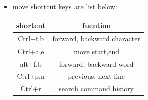 \documentclass[a4paper,12pt,twoside]{book}
\begin{document}
 \begin{itemize}
  \item move shortcut keys are list below:
\begin{center}
  \begin{tabular}{|c|c|}
 \hline shortcut & fucntion \\
\hline Ctrl+f,b & forward, backward character \\
\hline Ctrl+a,e & move start,end \\
\hline alt+f,b & forward, backward word \\
\hline Ctrl+p,n & previous, next line \\
\hline Ctrl+r & search command history \\
 \hline
  \end{tabular}
\end{center}


\end{itemize}
\end{document}
